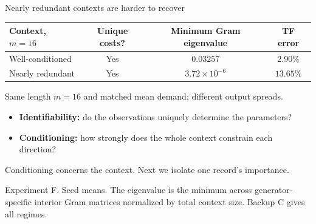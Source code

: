 \documentclass[aspectratio=169,11pt]{beamer}
\newcommand{\source}[1]{\par\vfill{\color{muted}\tiny #1}}
\begin{document}
\begin{frame}{Nearly redundant contexts are harder to recover}
\begin{center}
\begin{tabular}{lccc}
\toprule
Context, \(m=16\)&Unique costs?&Minimum Gram eigenvalue&TF error\\
\midrule
Well-conditioned&Yes&\(0.03257\)&\(2.90\%\)\\[2mm]
Nearly redundant&Yes&\(3.72\times10^{-6}\)&\(13.65\%\)\\
\bottomrule
\end{tabular}
\end{center}
\vspace{2mm}
\small Same length \(m=16\) and matched mean demand; different output spreads.
\vspace{2mm}
\begin{itemize}
\setlength{\itemsep}{3mm}
\item \textbf{Identifiability:} do the observations uniquely determine the parameters?
\item \textbf{Conditioning:} how strongly does the whole context constrain each direction?
\end{itemize}
\vspace{3mm}
{\color{teal}Conditioning concerns the context. Next we isolate one record's importance.}
\source{Experiment F. Seed means. The eigenvalue is the minimum across
generator-specific interior Gram matrices normalized by total context size.
Backup C gives all regimes.}
\end{frame}
\end{document}
